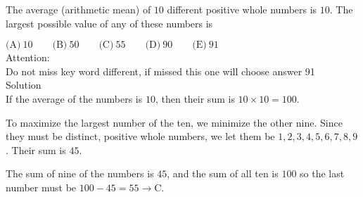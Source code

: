 

The average (arithmetic mean) of $10$ different positive whole numbers is $10$. The largest possible value of any of these numbers is

$\text{(A)}\ 10 \qquad \text{(B)}\ 50 \qquad \text{(C)}\ 55 \qquad \text{(D)}\ 90 \qquad \text{(E)}\ 91$
\\
Attention:
\\
Do not miss key word different, if missed this one will choose answer 91
\\
Solution
\\
If the average of the numbers is $10$, then their sum is $10\times 10=100$.

To maximize the largest number of the ten, we minimize the other nine. Since they must be distinct, positive whole numbers, we let them be $1,2,3,4,5,6,7,8,9$. Their sum is $45$.

The sum of nine of the numbers is $45$, and the sum of all ten is $100$ so the last number must be $100-45=55\rightarrow \boxed{\text{C}}$.
